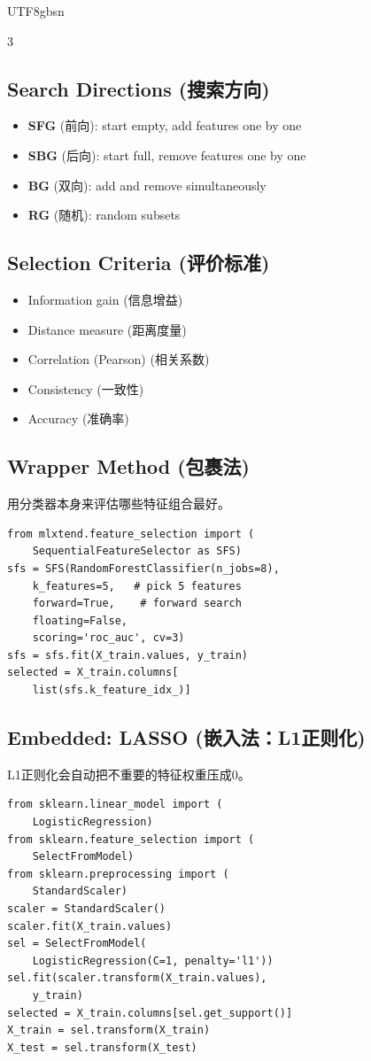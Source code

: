 \documentclass[10pt,landscape,a4paper]{article}
\newcommand{\zhint}[1]{{\scriptsize\color{gray!70!black}#1}}
\begin{document}
\begin{CJK}{UTF8}{gbsn}
\begin{multicols}{3}
\subsection{Search Directions \zhint{(搜索方向)}}
\begin{itemize}[leftmargin=*, nosep, itemsep=0pt]
    \item \textbf{SFG} \zhint{(前向)}: start empty, add features one by one
    \item \textbf{SBG} \zhint{(后向)}: start full, remove features one by one
    \item \textbf{BG} \zhint{(双向)}: add and remove simultaneously
    \item \textbf{RG} \zhint{(随机)}: random subsets
\end{itemize}

\subsection{Selection Criteria \zhint{(评价标准)}}
\begin{itemize}[leftmargin=*, nosep, itemsep=0pt]
    \item Information gain \zhint{(信息增益)}
    \item Distance measure \zhint{(距离度量)}
    \item Correlation (Pearson) \zhint{(相关系数)}
    \item Consistency \zhint{(一致性)}
    \item Accuracy \zhint{(准确率)}
\end{itemize}

\subsection{Wrapper Method \zhint{(包裹法)}}
\zhint{用分类器本身来评估哪些特征组合最好。}
\begin{lstlisting}
from mlxtend.feature_selection import (
    SequentialFeatureSelector as SFS)
sfs = SFS(RandomForestClassifier(n_jobs=8),
    k_features=5,   # pick 5 features
    forward=True,    # forward search
    floating=False,
    scoring='roc_auc', cv=3)
sfs = sfs.fit(X_train.values, y_train)
selected = X_train.columns[
    list(sfs.k_feature_idx_)]
\end{lstlisting}

\subsection{Embedded: LASSO \zhint{(嵌入法：L1正则化)}}
\zhint{L1正则化会自动把不重要的特征权重压成0。}
\begin{lstlisting}
from sklearn.linear_model import (
    LogisticRegression)
from sklearn.feature_selection import (
    SelectFromModel)
from sklearn.preprocessing import (
    StandardScaler)
scaler = StandardScaler()
scaler.fit(X_train.values)
sel = SelectFromModel(
    LogisticRegression(C=1, penalty='l1'))
sel.fit(scaler.transform(X_train.values),
    y_train)
selected = X_train.columns[sel.get_support()]
X_train = sel.transform(X_train)
X_test = sel.transform(X_test)
\end{lstlisting}


\end{multicols}
\end{CJK}
\end{document}

